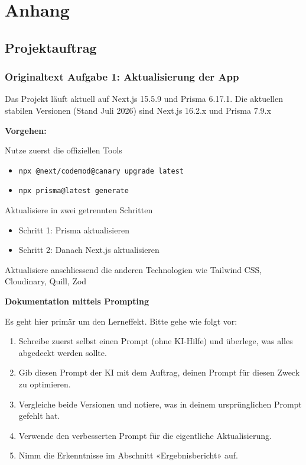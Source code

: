 \documentclass[11pt,a4paper]{article}
\newcommand{\minihead}[1]{\par\needspace{5\baselineskip}\noindent\textbf{#1}\par\nobreak}
\let\oldsubsection\subsection
\renewcommand{\subsection}{\needspace{6\baselineskip}\oldsubsection}
\let\oldsubsubsection\subsubsection
\renewcommand{\subsubsection}{\needspace{6\baselineskip}\oldsubsubsection}
\begin{document}
\clearpage
\appendix
\section{Anhang}

\subsection{Projektauftrag}
\label{app:auftrag}
\subsubsection{Originaltext Aufgabe 1: Aktualisierung der App}

Das Projekt läuft aktuell auf Next.js 15.5.9 und Prisma 6.17.1. Die aktuellen stabilen Versionen (Stand Juli 2026) sind Next.js 16.2.x und Prisma 7.9.x

\minihead{Vorgehen:}

Nutze zuerst die offiziellen Tools
\begin{itemize}[nosep]
  \item \texttt{npx @next/codemod@canary upgrade latest}
  \item \texttt{npx prisma@latest generate}
\end{itemize}

Aktualisiere in zwei getrennten Schritten
\begin{itemize}[nosep]
  \item Schritt 1: Prisma aktualisieren
  \item Schritt 2: Danach Next.js aktualisieren
\end{itemize}

Aktualisiere anschliessend die anderen Technologien wie Tailwind CSS, Cloudinary, Quill, Zod

\minihead{Dokumentation mittels Prompting}

Es geht hier primär um den Lerneffekt. Bitte gehe wie folgt vor:
\begin{enumerate}[nosep]
  \item Schreibe zuerst selbst einen Prompt (ohne KI-Hilfe) und überlege, was alles abgedeckt werden sollte.
  \item Gib diesen Prompt der KI mit dem Auftrag, deinen Prompt für diesen Zweck zu optimieren.
  \item Vergleiche beide Versionen und notiere, was in deinem ursprünglichen Prompt gefehlt hat.
  \item Verwende den verbesserten Prompt für die eigentliche Aktualisierung.
  \item Nimm die Erkenntnisse im Abschnitt «Ergebnisbericht» auf.
\end{enumerate}
\end{document}
